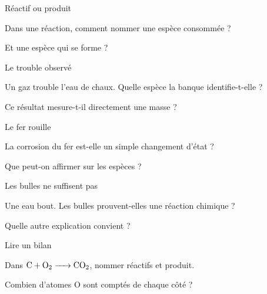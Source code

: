 \par\noindent\begin{minipage}{\linewidth}
\begin{exercice}[1]{Réactif ou produit}
\begin{questions}
\item Dans une réaction, comment nommer une espèce consommée ?
\item Et une espèce qui se forme ?
\end{questions}
\end{exercice}
\end{minipage}
\par\noindent\begin{minipage}{\linewidth}
\begin{exercice}[1]{Le trouble observé}
\begin{questions}
\item Un gaz trouble l’eau de chaux. Quelle espèce la banque identifie-t-elle ?
\item Ce résultat mesure-t-il directement une masse ?
\end{questions}
\end{exercice}
\end{minipage}
\par\noindent\begin{minipage}{\linewidth}
\begin{exercice}[1]{Le fer rouille}
\begin{questions}
\item La corrosion du fer est-elle un simple changement d’état ?
\item Que peut-on affirmer sur les espèces ?
\end{questions}
\end{exercice}
\end{minipage}
\par\noindent\begin{minipage}{\linewidth}
\begin{exercice}[1]{Les bulles ne suffisent pas}
\begin{questions}
\item Une eau bout. Les bulles prouvent-elles une réaction chimique ?
\item Quelle autre explication convient ?
\end{questions}
\end{exercice}
\end{minipage}
\clearpage{}
\par\noindent\begin{minipage}{\linewidth}
\begin{exercice}[2]{Lire un bilan}
\begin{questions}
\item Dans $\ce{C + O2 -> CO2}$, nommer réactifs et produit.
\item Combien d’atomes O sont comptés de chaque côté ?
\end{questions}
\end{exercice}
\end{minipage}
